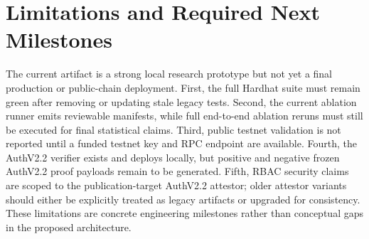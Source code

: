 \section{Limitations and Required Next Milestones}

The current artifact is a strong local research prototype but not yet a final production or public-chain deployment. First, the full Hardhat suite must remain green after removing or updating stale legacy tests. Second, the current ablation runner emits reviewable manifests, while full end-to-end ablation reruns must still be executed for final statistical claims. Third, public testnet validation is not reported until a funded testnet key and RPC endpoint are available. Fourth, the AuthV2.2 verifier exists and deploys locally, but positive and negative frozen AuthV2.2 proof payloads remain to be generated. Fifth, RBAC security claims are scoped to the publication-target AuthV2.2 attestor; older attestor variants should either be explicitly treated as legacy artifacts or upgraded for consistency. These limitations are concrete engineering milestones rather than conceptual gaps in the proposed architecture.

